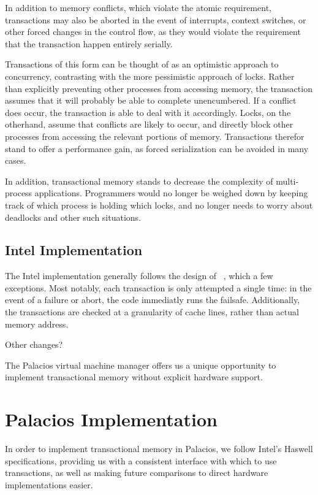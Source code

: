 \documentclass{acm_proc_article-sp}
\begin{document}
In addition to memory conflicts, which violate the atomic requirement, 
transactions may also be aborted in the event of interrupts, context switches,
or other forced changes in the control flow, as they would violate the
requirement that the transaction happen entirely serially. 

Transactions of this form can be thought of as an optimistic approach to
concurrency, contrasting with the more pessimistic approach of locks. 
Rather than explicitly preventing other processes from accessing memory, the
transaction assumes that it will probably be able to complete unencumbered. If
a conflict does occur, the transaction is able to deal with it accordingly.
Locks, on the otherhand, assume that conflicts are likely to occur, and 
directly block other processes from accessing the relevant portions of memory.
Transactions therefor stand to offer a performance gain, as forced 
serialization can be avoided in many cases.

In addition, transactional memory stands to decrease the complexity of 
multi-process applications. Programmers would no longer be weighed down by 
keeping track of which process is holding which locks, and no longer needs
to worry about deadlocks and other such situations.

\subsection{Intel Implementation}
The Intel implementation generally follows the design of 
~\cite{Herlihy:1993:TMA:173682.165164}, which a few exceptions.
Most notably, each transaction is only attempted a single time: in the event
of a failure or abort, the code immediatly runs the failsafe. Additionally, 
the transactions are checked at a granularity of cache lines, rather than
actual memory address. 

Other changes?

The Palacios virtual machine manager offers us a unique opportunity to
implement transactional memory without explicit hardware support.

\section{Palacios Implementation}
In order to implement transactional memory in Palacios, we follow Intel's
Haswell specifications, providing us with a consistent interface with which
to use transactions, as well as making future comparisons to direct hardware
implementations easier.
\end{document}
